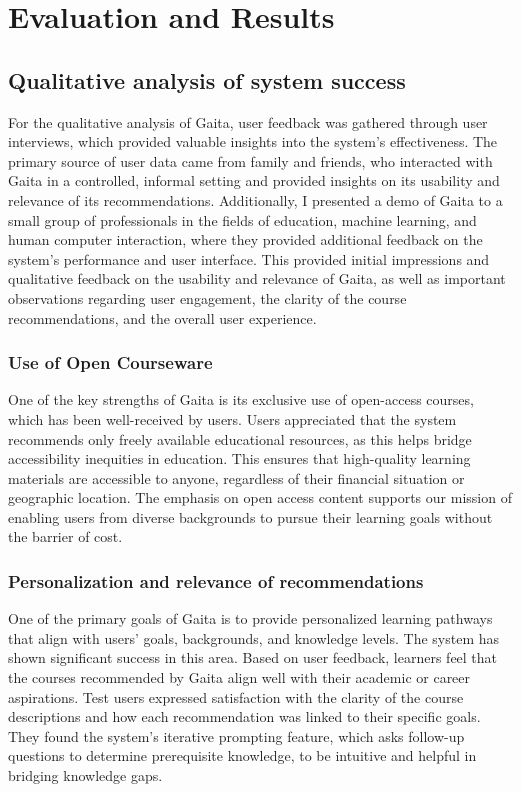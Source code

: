 \chapter{Evaluation and Results} \label{chap:chap-5}



\section{Qualitative analysis of system success}

For the qualitative analysis of Gaita, user feedback was gathered through user interviews, which provided valuable insights into the system’s effectiveness. The primary source of user data came from family and friends, who interacted with Gaita in a controlled, informal setting and provided insights on its usability and relevance of its recommendations. Additionally, I presented a demo of Gaita to a small group of professionals in the fields of education, machine learning, and human computer interaction, where they provided additional feedback on the system’s performance and user interface. This provided initial impressions and qualitative feedback on the usability and relevance of Gaita, as well as important observations regarding user engagement, the clarity of the course recommendations, and the overall user experience.


\subsection{Use of Open Courseware}

One of the key strengths of Gaita is its exclusive use of open-access courses, which has been well-received by users. Users appreciated that the system recommends only freely available educational resources, as this helps bridge accessibility inequities in education. This ensures that high-quality learning materials are accessible to anyone, regardless of their financial situation or geographic location. The emphasis on open access content supports our mission of enabling users from diverse backgrounds to pursue their learning goals without the barrier of cost. 

\subsection{Personalization and relevance of recommendations} 

One of the primary goals of Gaita is to provide personalized learning pathways that align with users’ goals, backgrounds, and knowledge levels. The system has shown significant success in this area. Based on user feedback, learners feel that the courses recommended by Gaita align well with their academic or career aspirations. Test users expressed satisfaction with the clarity of the course descriptions and how each recommendation was linked to their specific goals. They found the system's iterative prompting feature, which asks follow-up questions to determine prerequisite knowledge, to be intuitive and helpful in bridging knowledge gaps. 

